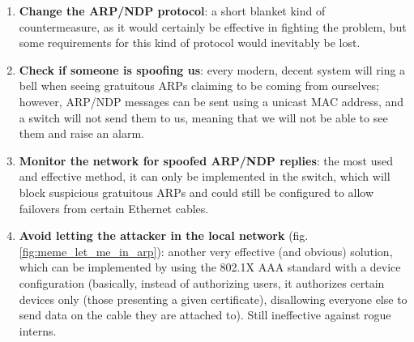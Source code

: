 \begin{enumerate}
\item\textbf{Change the ARP/NDP protocol}: a short blanket kind of countermeasure, as it would certainly be effective in fighting the problem, but some requirements for this kind of protocol would inevitably be lost.

\vspace{0.5em}
	
\item \textbf{Check if someone is spoofing us}: every modern, decent system will ring a bell when seeing gratuitous ARPs claiming to be coming from ourselves; however, ARP/NDP messages can be sent using a unicast MAC address, and a switch will not send them to us, meaning that we will not be able to see them and raise an alarm.
	
\vspace{0.5em}
	
\item \textbf{Monitor the network for spoofed ARP/NDP replies}: the most used and effective method, it can only be implemented in the switch, which will block suspicious gratuitous ARPs and could still be configured to allow failovers from certain Ethernet cables.

\vspace{0.5em}

\item \textbf{Avoid letting the attacker in the local network} (fig. \ref{fig:meme_let_me_in_arp}): another very effective (and obvious) solution, which can be implemented by using the 802.1X AAA standard with a device configuration (basically, instead of authorizing users, it authorizes certain devices only (those presenting a given certificate), disallowing everyone else to send data on the cable they are attached to). Still ineffective against rogue interns.


\end{enumerate}
